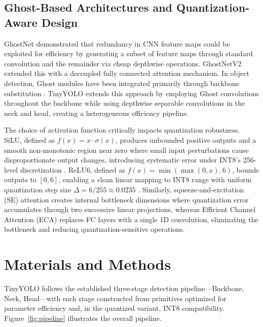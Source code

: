\documentclass[article,submit,moreauthors,pdftex,10pt,a4paper]{article}
\begin{document}
\subsection{Ghost-Based Architectures and Quantization-Aware Design}
GhostNet \cite{han2020ghostnet} demonstrated that redundancy in CNN feature maps could be exploited for efficiency by generating a subset of feature maps through standard convolution and the remainder via cheap depthwise operations. GhostNetV2 \cite{tang2022ghostnetv2} extended this with a decoupled fully connected attention mechanism. In object detection, Ghost modules have been integrated primarily through backbone substitution \cite{chen2023ghostdet, wang2022lightweight}. TinyYOLO extends this approach by employing Ghost convolutions throughout the backbone while using depthwise separable convolutions in the neck and head, creating a heterogeneous efficiency pipeline.

The choice of activation function critically impacts quantization robustness. SiLU, defined as $f(x) = x \cdot \sigma(x)$, produces unbounded positive outputs and a smooth non-monotonic region near zero where small input perturbations cause disproportionate output changes, introducing systematic error under INT8's 256-level discretization \cite{nagel2021white, banner2019post}. ReLU6, defined as $f(x) = \min(\max(0, x), 6)$, bounds outputs to $[0, 6]$, enabling a clean linear mapping to INT8 range with uniform quantization step size $\Delta = 6/255 \approx 0.0235$ \cite{sandler2018mobilenetv2}. Similarly, squeeze-and-excitation (SE) attention \cite{hu2018squeeze} creates internal bottleneck dimensions where quantization error accumulates through two successive linear projections, whereas Efficient Channel Attention (ECA) \cite{wang2020eca} replaces FC layers with a single 1D convolution, eliminating the bottleneck and reducing quantization-sensitive operations.

\section{Materials and Methods}
TinyYOLO follows the established three-stage detection pipeline---Backbone, Neck, Head---with each stage constructed from primitives optimized for parameter efficiency and, in the quantized variant, INT8 compatibility. Figure~\ref{fig:pipeline} illustrates the overall pipeline.
\end{document}
